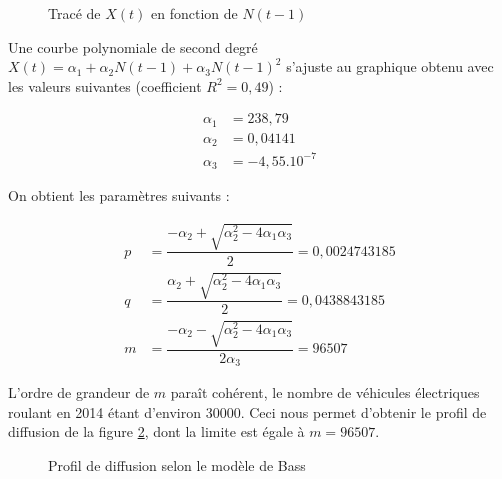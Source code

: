 		\begin{figure}[h!]
			\caption{Tracé de $X(t)$ en fonction de $N(t-1)$ \label{fig.courbeXt} }
			\begin{center}
			\end{center}
			
		\end{figure}
		
		
		Une courbe polynomiale de second degré $X(t) = \alpha_1 + \alpha_2 N(t-1) + \alpha_3 N(t-1)^2$ s'ajuste au graphique obtenu avec les valeurs suivantes (coefficient $R^2 = 0,49$) :
		
		\begin{align*}
			\alpha_1 &= 238,79\\
			\alpha_2 &= 0,04141\\
			\alpha_3 &= -4,55.10^{-7}
		\end{align*}

		On obtient les paramètres suivants :

		\begin{align*}
			p &= \dfrac{-\alpha_2 + \sqrt{\alpha_2^2 - 4 \alpha_1 \alpha_3}}{2} = 0,0024743185\\
			q &= \dfrac{\alpha_2 + \sqrt{\alpha_2^2 - 4 \alpha_1 \alpha_3}}{2} = 0,0438843185\\
			m &= \dfrac{-\alpha_2 - \sqrt{\alpha_2^2 - 4 \alpha_1 \alpha_3}}{2 \alpha_3} = 96507
		\end{align*}

		L'ordre de grandeur de $m$ paraît cohérent, le nombre de véhicules électriques roulant en 2014 étant d'environ 30000. Ceci nous permet d'obtenir le profil de diffusion de la figure \ref{fig.courbeBass1}, dont la limite est égale à $m = 96507$.

		\begin{figure}[h!]
			\caption{Profil de diffusion selon le modèle de Bass \label{fig.courbeBass1}}
			\begin{center}
			\end{center}
			
		\end{figure}


